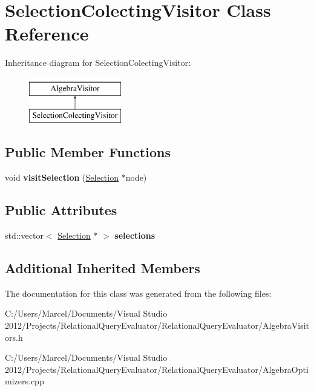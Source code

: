 \hypertarget{class_selection_colecting_visitor}{\section{Selection\+Colecting\+Visitor Class Reference}
\label{class_selection_colecting_visitor}
}
Inheritance diagram for Selection\+Colecting\+Visitor\+:\begin{figure}[H]
\begin{center}
\leavevmode
\includegraphics[height=2.000000cm]{class_selection_colecting_visitor}
\end{center}
\end{figure}
\subsection*{Public Member Functions}
\begin{DoxyCompactItemize}
\item 
\hypertarget{class_selection_colecting_visitor_a29c5a9ecf7dbfdc4b563b94385c61de3}{void {\bfseries visit\+Selection} (\hyperlink{class_selection}{Selection} $\ast$node)}\label{class_selection_colecting_visitor_a29c5a9ecf7dbfdc4b563b94385c61de3}

\end{DoxyCompactItemize}
\subsection*{Public Attributes}
\begin{DoxyCompactItemize}
\item 
\hypertarget{class_selection_colecting_visitor_a6323b360276b0ff23f5dcaa19b2317eb}{std\+::vector$<$ \hyperlink{class_selection}{Selection} $\ast$ $>$ {\bfseries selections}}\label{class_selection_colecting_visitor_a6323b360276b0ff23f5dcaa19b2317eb}

\end{DoxyCompactItemize}
\subsection*{Additional Inherited Members}


The documentation for this class was generated from the following files\+:\begin{DoxyCompactItemize}
\item 
C\+:/\+Users/\+Marcel/\+Documents/\+Visual Studio 2012/\+Projects/\+Relational\+Query\+Evaluator/\+Relational\+Query\+Evaluator/Algebra\+Visitors.\+h\item 
C\+:/\+Users/\+Marcel/\+Documents/\+Visual Studio 2012/\+Projects/\+Relational\+Query\+Evaluator/\+Relational\+Query\+Evaluator/Algebra\+Optimizers.\+cpp\end{DoxyCompactItemize}

